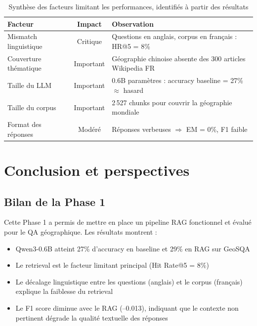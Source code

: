 \documentclass[12pt,a4paper]{article}
\begin{document}
\begin{table}[H]
\centering
\caption{Synthèse des facteurs limitant les performances, identifiés à partir des résultats}
\label{tab:facteurs}
\begin{tabularx}{\textwidth}{@{} l c X @{}}
\toprule
\textbf{Facteur} & \textbf{Impact} & \textbf{Observation} \\
\midrule
Mismatch linguistique & Critique & Questions en anglais, corpus en français : HR@5 = 8\% \\
\rowcolor{lightgray}
Couverture thématique & Important & Géographie chinoise absente des 300 articles Wikipedia FR \\
Taille du LLM & Important & 0.6B paramètres : accuracy baseline = 27\% $\approx$ hasard \\
\rowcolor{lightgray}
Taille du corpus & Important & 2\,527 chunks pour couvrir la géographie mondiale \\
Format des réponses & Modéré & Réponses verbeuses $\Rightarrow$ EM = 0\%, F1 faible \\
\bottomrule
\end{tabularx}
\end{table}

\section{Conclusion et perspectives}
\label{sec:conclusion}

\subsection{Bilan de la Phase 1}

Cette Phase 1 a permis de mettre en place un pipeline RAG fonctionnel et évalué pour le QA géographique. Les résultats montrent :

\begin{itemize}[leftmargin=*]
  \item Qwen3-0.6B atteint 27\% d'accuracy en baseline et 29\% en RAG sur GeoSQA
  \item Le retrieval est le facteur limitant principal (Hit Rate@5 = 8\%)
  \item Le décalage linguistique entre les questions (anglais) et le corpus (français) explique la faiblesse du retrieval
  \item Le F1 score diminue avec le RAG (--0.013), indiquant que le contexte non pertinent dégrade la qualité textuelle des réponses
\end{itemize}
\end{document}
